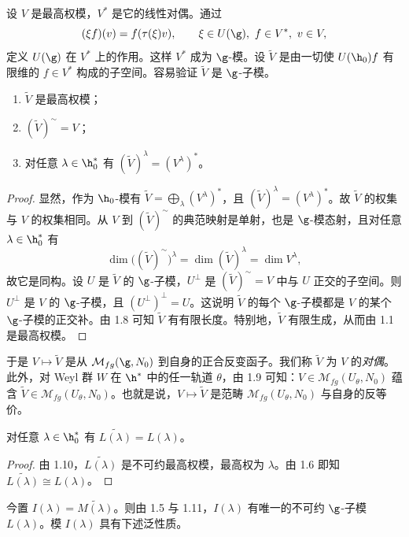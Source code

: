 设 $V$ 是最高权模，$V^*$ 是它的线性对偶。通过
$$(\xi f)(v)=f(\tau(\xi)v),\qquad \xi\in U(\g),\ f\in V^*,\ v\in V,$$
定义 $U(\g)$ 在 $V^*$ 上的作用。这样 $V^*$ 成为 $\g$-模。设 $\tilde V$ 是由一切使 $U(\h_0)f$ 有限维的 $f\in V^*$ 构成的子空间。容易验证 $\tilde V$ 是 $\g$-子模。

\begin{lemma}\label{lem:05.1.10}
\begin{enumerate}[label=(\roman*)]
\item $\tilde V$ 是最高权模；
\item $(\tilde V)^{\sim}=V$；
\item 对任意 $\lambda\in\h_0^*$ 有 $(\tilde V)^\lambda=(V^\lambda)^*$。
\end{enumerate}
\end{lemma}

\begin{proof}
显然，作为 $\h_0$-模有 $\tilde V=\bigoplus_\lambda(V^\lambda)^*$，且 $(\tilde V)^\lambda=(V^\lambda)^*$。故 $\tilde V$ 的权集与 $V$ 的权集相同。从 $V$ 到 $(\tilde V)^{\sim}$ 的典范映射是单射，也是 $\g$-模态射，且对任意 $\lambda\in\h_0^*$ 有
$$\dim\bigl((\tilde V)^{\sim}\bigr)^\lambda=\dim(\tilde V)^\lambda=\dim V^\lambda,$$
故它是同构。设 $U$ 是 $\tilde V$ 的 $\g$-子模，$U^\perp$ 是 $(\tilde V)^{\sim}=V$ 中与 $U$ 正交的子空间。则 $U^\perp$ 是 $V$ 的 $\g$-子模，且 $(U^\perp)^\perp=U$。这说明 $\tilde V$ 的每个 $\g$-子模都是 $V$ 的某个 $\g$-子模的正交补。由 1.8 可知 $\tilde V$ 有有限长度。特别地，$\tilde V$ 有限生成，从而由 1.1 是最高权模。
\end{proof}

于是 $V\mapsto\tilde V$ 是从 $\mathcal{M}_{fg}(\g,N_0)$ 到自身的正合反变函子。我们称 $\tilde V$ 为 $V$ 的\emph{对偶}。此外，对 Weyl 群 $W$ 在 $\h^*$ 中的任一轨道 $\theta$，由 1.9 可知：$V\in\mathcal{M}_{fg}(U_\theta,N_0)$ 蕴含 $\tilde V\in\mathcal{M}_{fg}(U_\theta,N_0)$。也就是说，$V\mapsto\tilde V$ 是范畴 $\mathcal{M}_{fg}(U_\theta,N_0)$ 与自身的反等价。

\begin{lemma}\label{lem:05.1.11}
对任意 $\lambda\in\h_0^*$ 有 $\widetilde{L(\lambda)}=L(\lambda)$。
\end{lemma}

\begin{proof}
由 1.10，$\widetilde{L(\lambda)}$ 是不可约最高权模，最高权为 $\lambda$。由 1.6 即知 $\widetilde{L(\lambda)}\cong L(\lambda)$。
\end{proof}

今置 $I(\lambda)=\widetilde{M(\lambda)}$。则由 1.5 与 1.11，$I(\lambda)$ 有唯一的不可约 $\g$-子模 $L(\lambda)$。模 $I(\lambda)$ 具有下述泛性质。

